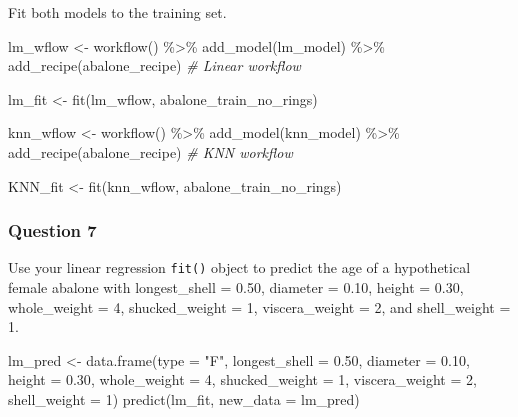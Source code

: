 \documentclass[
]{article}
\newenvironment{Shaded}{\begin{snugshade}}{\end{snugshade}}
\newcommand{\AttributeTok}[1]{\textcolor[rgb]{0.77,0.63,0.00}{#1}}
\newcommand{\CommentTok}[1]{\textcolor[rgb]{0.56,0.35,0.01}{\textit{#1}}}
\newcommand{\DecValTok}[1]{\textcolor[rgb]{0.00,0.00,0.81}{#1}}
\newcommand{\FloatTok}[1]{\textcolor[rgb]{0.00,0.00,0.81}{#1}}
\newcommand{\FunctionTok}[1]{\textcolor[rgb]{0.00,0.00,0.00}{#1}}
\newcommand{\NormalTok}[1]{#1}
\newcommand{\OtherTok}[1]{\textcolor[rgb]{0.56,0.35,0.01}{#1}}
\newcommand{\SpecialCharTok}[1]{\textcolor[rgb]{0.00,0.00,0.00}{#1}}
\newcommand{\StringTok}[1]{\textcolor[rgb]{0.31,0.60,0.02}{#1}}
\begin{document}
Fit both models to the training set.

\begin{Shaded}
\begin{Highlighting}[]
\NormalTok{lm\_wflow }\OtherTok{\textless{}{-}} \FunctionTok{workflow}\NormalTok{() }\SpecialCharTok{\%\textgreater{}\%} 
  \FunctionTok{add\_model}\NormalTok{(lm\_model) }\SpecialCharTok{\%\textgreater{}\%} 
  \FunctionTok{add\_recipe}\NormalTok{(abalone\_recipe)  }\CommentTok{\# Linear workflow}

\NormalTok{lm\_fit }\OtherTok{\textless{}{-}} \FunctionTok{fit}\NormalTok{(lm\_wflow, abalone\_train\_no\_rings)}
\end{Highlighting}
\end{Shaded}

\begin{Shaded}
\begin{Highlighting}[]
\NormalTok{knn\_wflow }\OtherTok{\textless{}{-}} \FunctionTok{workflow}\NormalTok{() }\SpecialCharTok{\%\textgreater{}\%} 
  \FunctionTok{add\_model}\NormalTok{(knn\_model) }\SpecialCharTok{\%\textgreater{}\%} 
  \FunctionTok{add\_recipe}\NormalTok{(abalone\_recipe)  }\CommentTok{\# KNN workflow}

\NormalTok{KNN\_fit }\OtherTok{\textless{}{-}} \FunctionTok{fit}\NormalTok{(knn\_wflow, abalone\_train\_no\_rings)}
\end{Highlighting}
\end{Shaded}

\hypertarget{question-7}{%
\subsubsection{Question 7}\label{question-7}}

Use your linear regression \texttt{fit()} object to predict the age of a
hypothetical female abalone with longest\_shell = 0.50, diameter = 0.10,
height = 0.30, whole\_weight = 4, shucked\_weight = 1, viscera\_weight =
2, and shell\_weight = 1.

\begin{Shaded}
\begin{Highlighting}[]
\NormalTok{lm\_pred }\OtherTok{\textless{}{-}} \FunctionTok{data.frame}\NormalTok{(}\AttributeTok{type =} \StringTok{"F"}\NormalTok{, }\AttributeTok{longest\_shell =} \FloatTok{0.50}\NormalTok{, }
                          \AttributeTok{diameter =} \FloatTok{0.10}\NormalTok{, }\AttributeTok{height =} \FloatTok{0.30}\NormalTok{, }
                          \AttributeTok{whole\_weight =} \DecValTok{4}\NormalTok{, }\AttributeTok{shucked\_weight =} \DecValTok{1}\NormalTok{, }
                          \AttributeTok{viscera\_weight =} \DecValTok{2}\NormalTok{, }\AttributeTok{shell\_weight =} \DecValTok{1}\NormalTok{)}
\FunctionTok{predict}\NormalTok{(lm\_fit, }\AttributeTok{new\_data =}\NormalTok{ lm\_pred)}
\end{Highlighting}
\end{Shaded}
\end{document}
